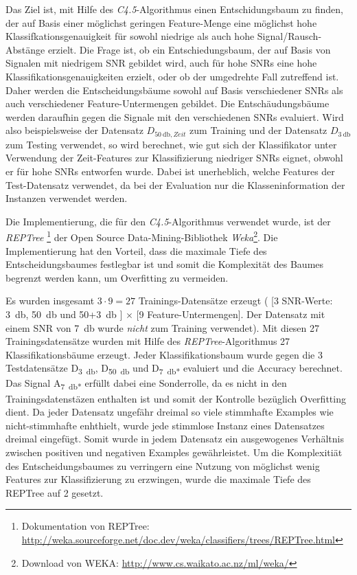 Das Ziel ist, mit Hilfe des \emph{C4.5}-Algorithmus einen Entschidungsbaum zu finden, der auf Basis einer möglichst geringen Feature-Menge eine möglichst hohe Klassifkationsgenauigkeit für sowohl niedrige als auch hohe Signal/Rausch-Abstänge erzielt. Die Frage ist, ob ein Entschiedungsbaum, der auf Basis von Signalen mit niedrigem SNR gebildet wird, auch für hohe SNRs eine hohe Klassifikationsgenauigkeiten erzielt, oder ob der umgedrehte Fall zutreffend ist. Daher werden die Entscheidungsbäume sowohl auf Basis verschiedener SNRs als auch verschiedener Feature-Untermengen gebildet. Die Entschäudungsbäume werden daraufhin gegen die Signale mit den verschiedenen SNRs evaluiert. Wird also beispielsweise der Datensatz $D_{\SI{50}{\decibel},Zeit}$ zum Training und der Datensatz $D_{\SI{3}{\decibel}}$ zum Testing verwendet, so wird berechnet, wie gut sich der Klassifikator unter Verwendung der Zeit-Features zur Klassifizierung niedriger SNRs eignet, obwohl er für hohe SNRs entworfen wurde. Dabei ist unerheblich, welche Features der Test-Datensatz verwendet, da bei der Evaluation nur die Klasseninformation der Instanzen verwendet werden.

Die Implementierung, die für den \emph{C4.5}-Algorithmus verwendet wurde, ist der \emph{REPTree} \footnote{Dokumentation von REPTree: \url{http://weka.sourceforge.net/doc.dev/weka/classifiers/trees/REPTree.html}} der Open Source Data-Mining-Bibliothek \emph{Weka}\footnote{Download von WEKA: \url{http://www.cs.waikato.ac.nz/ml/weka/}}. Die Implementierung hat den Vorteil, dass die maximale Tiefe des Entscheidungsbaumes festlegbar ist und somit die Komplexität des Baumes begrenzt werden kann, um Overfitting zu vermeiden.

Es wurden insgesamt $3 \cdot 9 = 27$ Trainings-Datensätze erzeugt ( [3 SNR-Werte: \SI{3}{\decibel}, \SI{50}{\decibel} und 50+\SI{3}{\decibel} ] $\times$ [9 Feature-Untermengen]. Der Datensatz mit einem SNR von \SI{7}{\decibel} wurde \emph{nicht} zum Training verwendet). Mit diesen 27 Trainingsdatensätze wurden mit Hilfe des \emph{REPTree}-Algorithmus 27 Klassifikationsbäume erzeugt. Jeder Klassifikationsbaum wurde gegen die 3 Testdatensätze D\textsubscript{\SI{3}{\decibel}}, D\textsubscript{\SI{50}{\decibel}} und D\textsubscript{\SI{7}{\decibel}*} evaluiert und die Accuracy berechnet. Das Signal A\textsubscript{\SI{7}{\decibel}*} erfüllt dabei eine Sonderrolle, da es nicht in den Trainingsdatenstäzen enthalten ist und somit der Kontrolle bezüglich Overfitting dient. Da jeder Datensatz ungefähr dreimal so viele stimmhafte Examples wie nicht-stimmhafte enhthielt, wurde jede stimmlose Instanz eines Datensatzes dreimal eingefügt. Somit wurde in jedem Datensatz  ein ausgewogenes Verhältnis zwischen positiven und negativen Examples gewährleistet. Um die Komplexitiät des Entscheidungsbaumes zu verringern eine Nutzung von möglichst wenig Features zur Klassifizierung zu erzwingen, wurde die maximale Tiefe des REPTree auf 2 gesetzt. 

